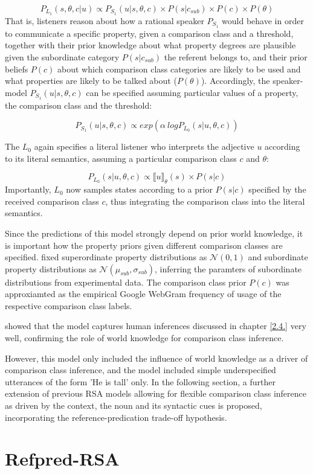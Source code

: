$$P_{L_1}(s, \theta, c | u) \propto P_{S_1} ( u | s, \theta, c) \times P(s | c_{sub}) \times P(c) \times P(\theta)$$  
That is, listeners reason about how a rational speaker $P_{S_1}$ would behave in order to communicate a specific property, given a comparison class and a threshold, together with their prior knowledge about what property degrees are plausible given the subordinate category $P(s | c _{sub})$ the referent belongs to, and their prior beliefs $P(c)$ about which comparison class categories are likely to be used and what properties are likely to be talked about ($P(\theta)$). Accordingly, the speaker-model $P_{S_1}( u | s, \theta, c)$ can be specified assuming particular values of a property, the comparison class and the threshold:

$$P_{S_1}( u | s, \theta, c) \propto exp(\alpha \: log P_{L_0} (s | u, \theta, c))$$

The $L_0$ again specifies a literal listener who interprets the adjective $u$ according to its literal semantics, assuming a particular comparison class $c$ and $\theta$:

$$P_{L_0}(s | u, \theta, c) \propto \llbracket u \rrbracket_{\theta} (s) \times P( s | c)$$  
Importantly, $L_0$ now samples states according to a prior $P(s|c)$ specified by the received comparison class $c$, thus integrating the comparison class into the literal semantics. 

Since the predictions of this model strongly depend on prior world knowledge, it is important how the property priors given different comparison classes are specified. \textcite{tessler2017warm} fixed superordinate property distributions as $\mathcal{N} (0, 1)$ and subordinate property distributions as $\mathcal{N}(\mu_{sub}, \sigma_{sub})$, inferring the paramters of subordinate distributions from experimental data. The comparison class prior $P(c)$ was approxiamted as the empirical Google WebGram frequency of usage of the respective comparison class labels.

\textcite{tessler2017warm} showed that the model captures human inferences discussed in chapter \ref{2.4.} very well, confirming the role of world knowledge for comparison class inference. 

However, this model only included the influence of world knowledge as a driver of comparison class inference, and the model included simple underspecified utterances of the form 'He is tall' only. In the following section, a further extension of previous RSA models allowing for flexible comparison class inference as driven by the context, the noun and its syntactic cues is proposed, incorporating the reference-predication trade-off hypothesis. 

\section{Refpred-RSA}
